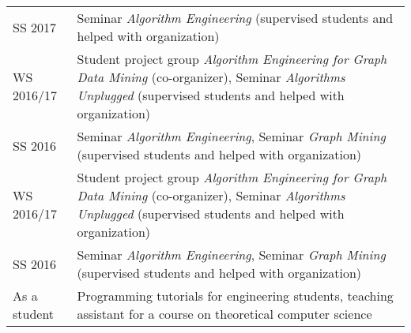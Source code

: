 \documentclass[11pt, a4paper, DIV=14, headings=small]{scrartcl}
\begin{document}
\begin{longtabu}{p{2.1cm}p{12.0cm}}
		SS 2017    & Seminar \emph{Algorithm Engineering} (supervised students and helped with organization)                                                                                         \\
		WS 2016/17 & Student project group \emph{Algorithm Engineering for Graph Data Mining} (co-organizer), Seminar \emph{Algorithms Unplugged} (supervised students and helped with organization) \\
		SS 2016    & Seminar \emph{Algorithm Engineering}, Seminar \emph{Graph Mining} (supervised students and helped with organization)                                                            \\
		WS 2016/17   & Student project group \emph{Algorithm Engineering for Graph Data Mining} (co-organizer), Seminar \emph{Algorithms Unplugged} (supervised students and helped with organization) \\
		SS 2016      & Seminar \emph{Algorithm Engineering}, Seminar \emph{Graph Mining} (supervised students and helped with organization)                                                            \\
		As a student & Programming tutorials for engineering students, teaching assistant for a course on theoretical computer science                                                                 \\
	\end{longtabu}
\end{document}
